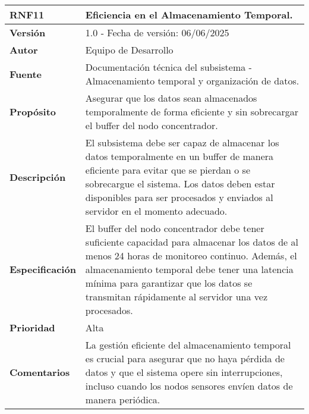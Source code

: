\begin{longtable}{|l|p{12cm}|}
\hline
\textbf{RNF11} & \textbf{Eficiencia en el Almacenamiento Temporal.} \\
\hline
\endfirsthead
\hline
\textbf{Versión} & 1.0 - Fecha de versión: 06/06/2025 \\
\hline
\textbf{Autor} & Equipo de Desarrollo \\
\hline
\textbf{Fuente} & Documentación técnica del subsistema - Almacenamiento temporal y organización de datos. \\
\hline
\textbf{Propósito} & Asegurar que los datos sean almacenados temporalmente de forma eficiente y sin sobrecargar el buffer del nodo concentrador. \\
\hline
\textbf{Descripción} & El subsistema debe ser capaz de almacenar los datos temporalmente en un buffer de manera eficiente para evitar que se pierdan o se sobrecargue el sistema. Los datos deben estar disponibles para ser procesados y enviados al servidor en el momento adecuado. \\
\hline
\textbf{Especificación} & El buffer del nodo concentrador debe tener suficiente capacidad para almacenar los datos de al menos 24 horas de monitoreo continuo. Además, el almacenamiento temporal debe tener una latencia mínima para garantizar que los datos se transmitan rápidamente al servidor una vez procesados. \\
\hline
\textbf{Prioridad} & Alta \\
\hline
\textbf{Comentarios} & La gestión eficiente del almacenamiento temporal es crucial para asegurar que no haya pérdida de datos y que el sistema opere sin interrupciones, incluso cuando los nodos sensores envíen datos de manera periódica. \\
\hline
\end{longtable}

